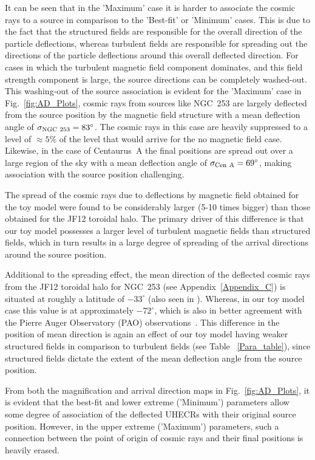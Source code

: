\documentclass[usenatbib]{mnras}
\begin{document}
It can be seen that in the 'Maximum' case it is harder to associate the cosmic rays to a source in comparison to the 'Best-fit' or 'Minimum' cases. This is due to the fact that the structured fields are responsible for the overall direction of the particle deflections, whereas turbulent fields are responsible for spreading out the directions of the particle deflections around this overall deflected direction. For cases in which the turbulent magnetic field component dominates, and this field strength component is large, the source directions can be completely washed-out.
This washing-out of the source association is evident for the 'Maximum' case in Fig.~\ref{fig:AD_Plots}, cosmic rays from sources like NGC~253 are largely deflected from the source position by the magnetic field structure with a mean deflection angle of $\sigma_{\rm NGC~253} = 83^{\circ}$. The cosmic rays in this case are heavily suppressed to a level of $\approx 5\%$ of the level that would arrive for the no magnetic field case. Likewise, in the case of Centaurus~A the final positions are spread out over a large region of the sky with a mean deflection angle of $\sigma_{\rm Cen~A} = 69^{\circ}$, making association with the source position challenging.

The spread of the cosmic rays due to deflections by magnetic field obtained for
the toy model were found to be considerably larger (5-10 times bigger) than those obtained for the JF12 toroidal halo. The primary driver of this difference is that our toy model possesses a larger level of turbulent magnetic fields than structured fields, which in turn results in a large degree of spreading of the arrival directions around the source position. 

Additional to the spreading effect, the mean direction of the deflected cosmic rays from the JF12 toroidal halo for NGC~253 (see Appendix~\ref{Appendix_C}) is situated at roughly a latitude of $-33^{\circ}$ (also seen in \citet{Arjen_2021}). Whereas, in our toy model case this value is at approximately $-72^{\circ}$, which is also in better agreement with the Pierre Auger Observatory (PAO) observations~\citep{Auger_Starburst2018}. This difference in the position of mean direction is again an effect of our toy model having weaker structured fields in comparison to turbulent fields (see Table ~\ref{Para_table}), since structured fields dictate the extent of the mean deflection angle from the source position. 

From both the magnification and arrival direction maps in Fig.~\ref{fig:AD_Plots}, it is evident that the best-fit and lower extreme ('Minimum') parameters allow some degree of association of the deflected UHECRs with their original source position. However, in the upper extreme ('Maximum') parameters, such a connection between the point of origin of cosmic rays and their final positions is heavily erased. 
\end{document}
